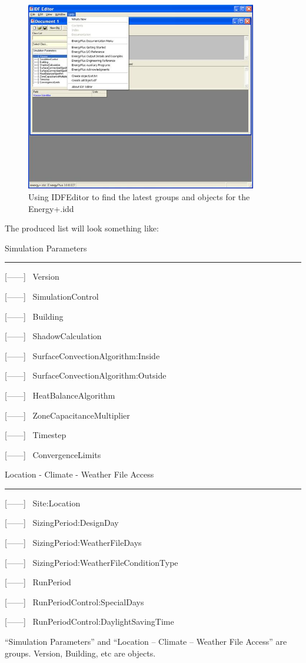 \begin{figure}[hbtp] %
\centering
\includegraphics[width=0.9\textwidth, height=0.9\textheight, keepaspectratio=true]{media/image002.jpg}
\caption{Using IDFEditor to find the latest groups and objects for the Energy+.idd \protect \label{fig:using-idfeditor-to-find-the-latest-groups}}
\end{figure}

The produced list will look something like:

Simulation Parameters

\begin{center}\rule{0.5\linewidth}{\linethickness}\end{center}

{[}------{]}~ Version

{[}------{]}~ SimulationControl

{[}------{]}~ Building

{[}------{]}~ ShadowCalculation

{[}------{]}~ SurfaceConvectionAlgorithm:Inside

{[}------{]}~ SurfaceConvectionAlgorithm:Outside

{[}------{]}~ HeatBalanceAlgorithm

{[}------{]}~ ZoneCapacitanceMultiplier

{[}------{]}~ Timestep

{[}------{]}~ ConvergenceLimits

Location - Climate - Weather File Access

\begin{center}\rule{0.5\linewidth}{\linethickness}\end{center}

{[}------{]}~ Site:Location

{[}------{]}~ SizingPeriod:DesignDay

{[}------{]}~ SizingPeriod:WeatherFileDays

{[}------{]}~ SizingPeriod:WeatherFileConditionType

{[}------{]}~ RunPeriod

{[}------{]}~ RunPeriodControl:SpecialDays

{[}------{]}~ RunPeriodControl:DaylightSavingTime

``Simulation Parameters'' and ``Location -- Climate -- Weather File Access'' are groups. Version, Building, etc are objects.
